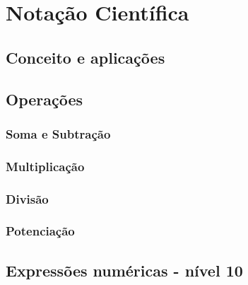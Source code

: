 \chapter[Notação Científica]{Notação Científica}

\section{Conceito e aplicações}

\section{Operações}

\subsection{Soma e Subtração}
\subsection{Multiplicação}
\subsection{Divisão}
\subsection{Potenciação}


\section{Expressões numéricas - nível 10}

